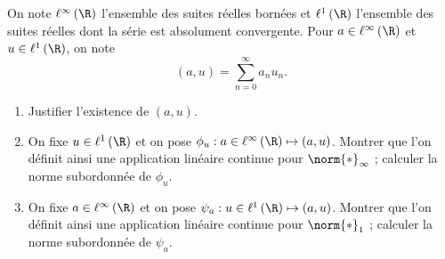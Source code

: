 \begin{enonce}
\begin{exercise}[ID={RMS123 E589 Mines PSI},subtitle={},tags={}, difficulty={0}]
On note $\ell^\infty\left( \R \right)$ l'ensemble des suites réelles bornées et $\ell^1\left( \R \right)$ l'ensemble des suites réelles dont la série est absolument convergente.
Pour $a\in\ell^\infty\left( \R \right)$ et $u\in\ell^1\left( \R \right)$, on note
\begin{equation*}
  \left( a,u \right) = \sum_{n=0}^\infty a_nu_n.
\end{equation*}
\begin{enumerate}
  \item Justifier l'existence de $\left( a,u \right)$.
  \item On fixe $u\in\ell^1\left( \R \right)$ et on pose $\phi_u : a\in\ell^\infty\left( \R \right)\mapsto \left( a,u \right)$.
    Montrer que l'on définit ainsi une application linéaire continue pour $\norm{*}_\infty$ ; calculer la norme subordonnée de $\phi_u$.
  \item On fixe $a\in\ell^\infty\left( \R \right)$ et on pose $\psi_a : u\in\ell^1\left( \R \right)\mapsto \left( a,u \right)$.
    Montrer que l'on définit ainsi une application linéaire continue pour $\norm{*}_1$ ; calculer la norme subordonnée de $\psi_a$.
\end{enumerate}
\end{exercise}
\begin{solution}
\end{solution}
\end{enonce}
